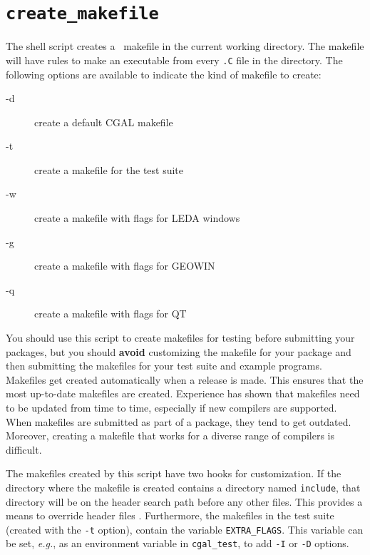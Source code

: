 \section{{\tt create\_makefile}}
\label{sec:create_makefile}

The shell script  creates a \cgal\ makefile
in the current working directory.
The makefile will have rules to make an executable from every {\tt .C} 
file in the directory.  The following options are available 
to indicate the kind of makefile to create:
\begin{description}
\item[-d]   create a default CGAL makefile
\item[-t]   create a makefile for the test suite
\item[-w]   create a makefile with flags for LEDA windows
\item[-g]   create a makefile with flags for GEOWIN
\item[-q]   create a makefile with flags for QT
\end{description}

You should use this script to create makefiles for testing before submitting
your packages, but you should {\bf avoid} customizing the makefile for your 
package and then submitting the makefiles for your test suite and example 
programs.
Makefiles get created automatically when a release is made. This ensures 
that the most up-to-date makefiles are created. Experience has shown
that makefiles need to be updated from time to time, especially if new
compilers are supported. When makefiles are submitted as part of a package,
they tend to get outdated.
Moreover, creating a makefile that works for a diverse range of compilers
is difficult.

The makefiles created by this script have two hooks for customization. 
If the directory
where the makefile is created contains a directory named {\tt include},%
that
directory will be on the header search path before any other files. This
provides a means to override header files%
. 
Furthermore, the makefiles in the
test suite (created with the {\tt -t} option), contain the variable 
{\tt EXTRA\_FLAGS}.%
This variable can be set, {\em e.g.}, as an environment variable in 
{\tt cgal\_test}, to add {\tt -I} or {\tt -D} options.


